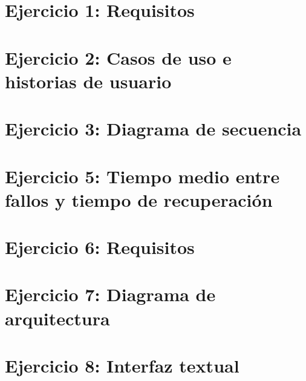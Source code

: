 

\section{Ejercicio 1: Requisitos}\label{sec:ejercicio-1:-requisitos}



\section{Ejercicio 2: Casos de uso e historias de usuario}\label{sec:ejercicio-2:-casos-de-uso-e-historias-de-usuario}



\section{Ejercicio 3: Diagrama de secuencia}\label{sec:ejercicio-3:-diagrama-de-secuencia}



\section{Ejercicio 5: Tiempo medio entre fallos y tiempo de recuperación}\label{sec:ejercicio-5:-tiempo-medio-entre-fallos-y-tiempo-de-recuperacion}



\clearpage


\section{Ejercicio 6: Requisitos}\label{sec:ejercicio-6-:-requisitos}



\clearpage


\section{Ejercicio 7: Diagrama de arquitectura}\label{sec:ejercicio-7:-diagrama-de-arquitectura}



\section{Ejercicio 8: Interfaz textual}\label{sec:ejercicio-8:-interfaz-textual}

